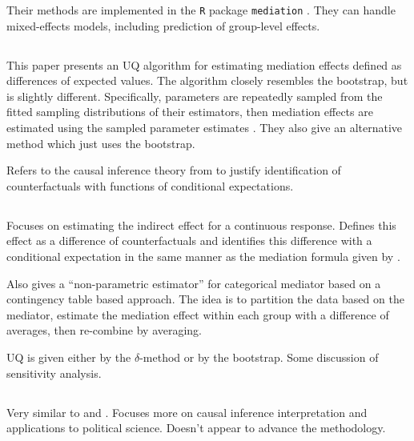 \documentclass{report}
\begin{document}
Their methods are implemented in the \texttt{R} package \texttt{mediation} \citep{Tin14}. They can handle mixed-effects models, including prediction of group-level effects.


\subsection{\citet{Ima10I}}

This paper presents an UQ algorithm for estimating mediation effects defined as differences of expected values. The algorithm closely resembles the bootstrap, but is slightly different. Specifically, parameters are repeatedly sampled from the fitted sampling distributions of their estimators, then mediation effects are estimated using the sampled parameter estimates \citep[see, e.g.,][]{Kin00}. They also give an alternative method which just uses the bootstrap.

Refers to the causal inference theory from \citet{Ima10II} to justify identification of counterfactuals with functions of conditional expectations.

\subsection{\citet{Ima10II}}

Focuses on estimating the indirect effect for a continuous response. Defines this effect as a difference of counterfactuals and identifies this difference with a conditional expectation in the same manner as the mediation formula given by \citet{Pea12}. 

Also gives a ``non-parametric estimator'' for categorical mediator based on a contingency table based approach. The idea is to partition the data based on the mediator, estimate the mediation effect within each group with a difference of averages, then re-combine by averaging.

UQ is given either by the $\delta$-method or by the bootstrap. Some discussion of sensitivity analysis.


\subsection{\citet{Ima11}}

Very similar to \citet{Ima10I} and \citet{Ima10II}. Focuses more on causal inference interpretation and applications to political science. Doesn't appear to advance the methodology.

\subsection{\citet{Tin14}}
\end{document}
